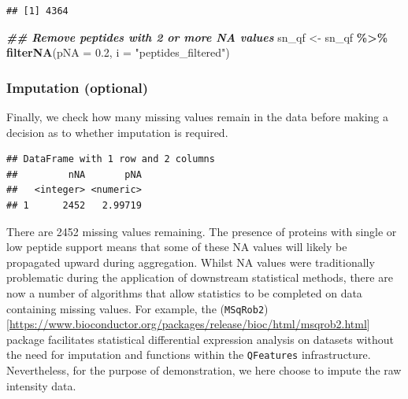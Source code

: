 \documentclass[9pt,a4paper,]{extarticle}
\newenvironment{Shaded}{\begin{snugshade}}{\end{snugshade}}
\newcommand{\AttributeTok}[1]{\textcolor[rgb]{0.13,0.29,0.53}{#1}}
\newcommand{\DocumentationTok}[1]{\textcolor[rgb]{0.56,0.35,0.01}{\textbf{\textit{#1}}}}
\newcommand{\FloatTok}[1]{\textcolor[rgb]{0.00,0.00,0.81}{#1}}
\newcommand{\FunctionTok}[1]{\textcolor[rgb]{0.13,0.29,0.53}{\textbf{#1}}}
\newcommand{\NormalTok}[1]{#1}
\newcommand{\OtherTok}[1]{\textcolor[rgb]{0.56,0.35,0.01}{#1}}
\newcommand{\SpecialCharTok}[1]{\textcolor[rgb]{0.81,0.36,0.00}{\textbf{#1}}}
\newcommand{\StringTok}[1]{\textcolor[rgb]{0.31,0.60,0.02}{#1}}
\begin{document}
\begin{verbatim}
## [1] 4364
\end{verbatim}

\begin{Shaded}
\begin{Highlighting}[]
\DocumentationTok{\#\# Remove peptides with 2 or more NA values}
\NormalTok{sn\_qf }\OtherTok{\textless{}{-}}\NormalTok{ sn\_qf }\SpecialCharTok{\%\textgreater{}\%}
  \FunctionTok{filterNA}\NormalTok{(}\AttributeTok{pNA =} \FloatTok{0.2}\NormalTok{,}
           \AttributeTok{i =} \StringTok{"peptides\_filtered"}\NormalTok{)}
\end{Highlighting}
\end{Shaded}

\hypertarget{imputation-optional-1}{%
\subsubsection{Imputation (optional)}\label{imputation-optional-1}}

Finally, we check how many missing values remain in the data before making a
decision as to whether imputation is required.

\begin{Shaded}
\end{Shaded}

\begin{verbatim}
## DataFrame with 1 row and 2 columns
##         nNA       pNA
##   <integer> <numeric>
## 1      2452   2.99719
\end{verbatim}

There are 2452 missing values remaining.
The presence of proteins with single or low peptide support means that some of
these NA values will likely be propagated upward during aggregation. Whilst NA
values were traditionally problematic during the application of downstream
statistical methods, there are now a number of algorithms that allow statistics
to be completed on data containing missing values. For example, the
(\texttt{MSqRob2}){[}\url{https://www.bioconductor.org/packages/release/bioc/html/msqrob2.html}{]}
\citetext{\citealp[\citet{Goeminne2020}]{Sticker2020}; \citealp{Goeminne2016}} package facilitates statistical
differential expression analysis on datasets without the need for imputation and
functions within the \texttt{QFeatures} infrastructure. Nevertheless, for the purpose of
demonstration, we here choose to impute the raw intensity data.
\end{document}
